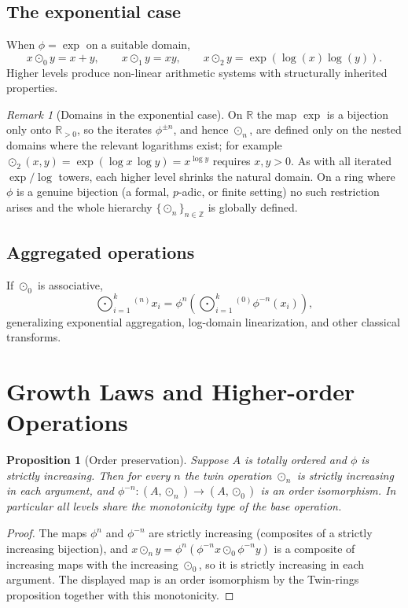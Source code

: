 \documentclass[11pt]{article}
\newtheorem{proposition}[theorem]{Proposition}
\theoremstyle{definition}
\theoremstyle{remark}
\newtheorem{remark}[theorem]{Remark}
\newcommand{\Z}{\mathbb{Z}}
\newcommand{\R}{\mathbb{R}}
\begin{document}
	\subsection{The exponential case}
	
	When $\phi=\exp$ on a suitable domain,
	\[
	x\odot_0 y=x+y,\qquad
	x\odot_1 y=xy,\qquad
	x\odot_2 y=\exp(\log(x)\log(y)).
	\]
	Higher levels produce non-linear arithmetic systems 
	with structurally inherited properties.

	\begin{remark}[Domains in the exponential case]
		On $\R$ the map $\exp$ is a bijection only onto $\R_{>0}$, so the iterates $\phi^{\pm n}$, and
		hence $\odot_n$, are defined only on the nested domains where the relevant logarithms exist; for
		example $\odot_2(x,y)=\exp(\log x\,\log y)=x^{\log y}$ requires $x,y>0$. As with all iterated
		$\exp/\log$ towers, each higher level shrinks the natural domain. On a ring where $\phi$ is a
		genuine bijection (a formal, $p$-adic, or finite setting) no such restriction arises and the whole
		hierarchy $\{\odot_n\}_{n\in\Z}$ is globally defined.
	\end{remark}
	
	\subsection{Aggregated operations}
	
	If $\odot_0$ is associative,
	\[
	\bigodot_{i=1}^k{}^{(n)} x_i
	=
	\phi^n\left(\bigodot_{i=1}^k{}^{(0)}\phi^{-n}(x_i)\right),
	\]
	generalizing exponential aggregation, log-domain linearization, and 
	other classical transforms.
	
	\section{Growth Laws and Higher-order Operations}

	\begin{proposition}[Order preservation]
		Suppose $A$ is totally ordered and $\phi$ is strictly increasing. Then for every $n$ the twin
		operation $\odot_n$ is strictly increasing in each argument, and
		$\phi^{-n}:(A,\odot_n)\to(A,\odot_0)$ is an order isomorphism. In particular all levels share the
		monotonicity type of the base operation.
	\end{proposition}
	\begin{proof}
		The maps $\phi^{n}$ and $\phi^{-n}$ are strictly increasing (composites of a strictly increasing
		bijection), and $x\odot_n y=\phi^{n}(\phi^{-n}x\odot_0\phi^{-n}y)$ is a composite of increasing maps
		with the increasing $\odot_0$, so it is strictly increasing in each argument. The displayed map is
		an order isomorphism by the Twin-rings proposition together with this monotonicity.
	\end{proof}
\end{document}
